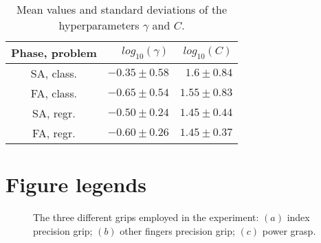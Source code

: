 \documentclass[10pt]{bmc_article}
\def\texttt{[image: ]}
\newenvironment{bmcformat}
  {\begin{raggedright}\baselineskip20pt\sloppy\setboolean{publ}{false}}
  {\end{raggedright}\baselineskip20pt\sloppy}
\begin{document}
\begin{bmcformat}
\begin{table}[!ht] \centering
  \caption{Mean values and standard deviations of the hyperparameters $\gamma$ and $C$.}
  \begin{tabular}{|c|r|r|}
    \hline
    Phase, problem & $log_{10}(\gamma)$ & $log_{10}(C)$ \\
    \hline
    SA, class.     & $-0.35 \pm 0.58$   & $1.6  \pm 0.84$ \\
    FA, class.     & $-0.65 \pm 0.54$   & $1.55 \pm 0.83$ \\
    SA, regr.      & $-0.50 \pm 0.24$   & $1.45 \pm 0.44$ \\
    FA, regr.      & $-0.60 \pm 0.26$   & $1.45 \pm 0.37$ \\
    \hline
  \end{tabular}
  \label{tab:hyp}
\end{table}

\section*{Figure legends}


\begin{figure}[!ht] \centering
  \caption{The three different grips employed in the experiment: $(a)$
   index precision grip; $(b)$ other fingers precision grip; $(c)$
   power grasp.}
  \label{fig:Grasps}
\end{figure}


\end{bmcformat}
\end{document}
